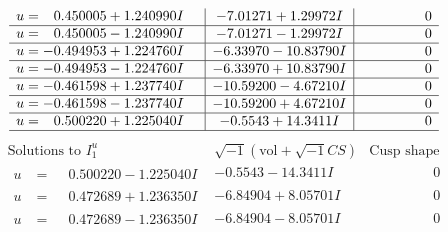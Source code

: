 \documentclass[1p]{elsarticle_modified}
\theoremstyle{definition}
\newcommand{\I}{\sqrt{-1}}
\begin{document}
$$\begin{array}{c|c|c}
\begin{aligned}
u &= \phantom{-}0.450005 + 1.240990 I\end{aligned}
 & -7.01271 + 1.29972 I & \phantom{-0.000000 } 0 \\ \hline\begin{aligned}
u &= \phantom{-}0.450005 - 1.240990 I\end{aligned}
 & -7.01271 - 1.29972 I & \phantom{-0.000000 } 0 \\ \hline\begin{aligned}
u &= -0.494953 + 1.224760 I\end{aligned}
 & -6.33970 - 10.83790 I & \phantom{-0.000000 } 0 \\ \hline\begin{aligned}
u &= -0.494953 - 1.224760 I\end{aligned}
 & -6.33970 + 10.83790 I & \phantom{-0.000000 } 0 \\ \hline\begin{aligned}
u &= -0.461598 + 1.237740 I\end{aligned}
 & -10.59200 - 4.67210 I & \phantom{-0.000000 } 0 \\ \hline\begin{aligned}
u &= -0.461598 - 1.237740 I\end{aligned}
 & -10.59200 + 4.67210 I & \phantom{-0.000000 } 0 \\ \hline\begin{aligned}
u &= \phantom{-}0.500220 + 1.225040 I\end{aligned}
 & -0.5543 + 14.3411 I & \phantom{-0.000000 } 0\\
 \hline 
 \end{array}$$\newpage$$\begin{array}{c|c|c}  
\text{Solutions to }I^u_{1}& \I (\text{vol} + \sqrt{-1}CS) & \text{Cusp shape}\\
 \hline 
\begin{aligned}
u &= \phantom{-}0.500220 - 1.225040 I\end{aligned}
 & -0.5543 - 14.3411 I & \phantom{-0.000000 } 0 \\ \hline\begin{aligned}
u &= \phantom{-}0.472689 + 1.236350 I\end{aligned}
 & -6.84904 + 8.05701 I & \phantom{-0.000000 } 0 \\ \hline\begin{aligned}
u &= \phantom{-}0.472689 - 1.236350 I\end{aligned}
 & -6.84904 - 8.05701 I & \phantom{-0.000000 } 0 \\ \hline\begin{aligned}

\end{aligned}
\end{array}$$
\end{document}
